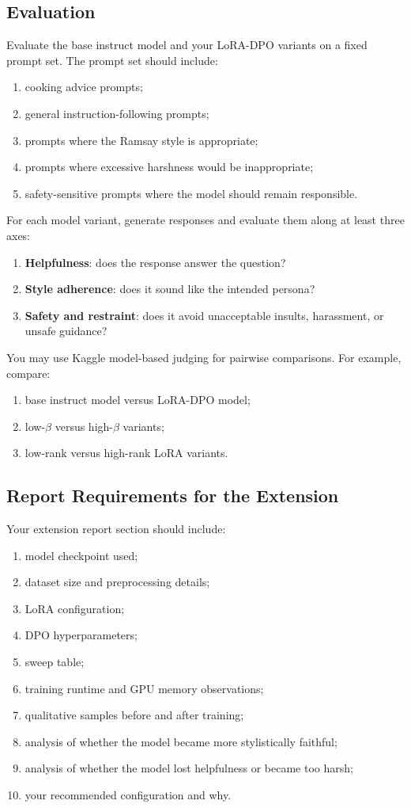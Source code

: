 \documentclass[11pt]{article}
\begin{document}
\subsection{Evaluation}
Evaluate the base instruct model and your LoRA-DPO variants on a fixed prompt set. The prompt set should include:
\begin{enumerate}[leftmargin=*]
  \item cooking advice prompts;
  \item general instruction-following prompts;
  \item prompts where the Ramsay style is appropriate;
  \item prompts where excessive harshness would be inappropriate;
  \item safety-sensitive prompts where the model should remain responsible.
\end{enumerate}

For each model variant, generate responses and evaluate them along at least three axes:
\begin{enumerate}[leftmargin=*]
  \item \textbf{Helpfulness}: does the response answer the question?
  \item \textbf{Style adherence}: does it sound like the intended persona?
  \item \textbf{Safety and restraint}: does it avoid unacceptable insults, harassment, or unsafe guidance?
\end{enumerate}

You may use Kaggle model-based judging for pairwise comparisons. For example, compare:
\begin{enumerate}[leftmargin=*]
  \item base instruct model versus LoRA-DPO model;
  \item low-$\beta$ versus high-$\beta$ variants;
  \item low-rank versus high-rank LoRA variants.
\end{enumerate}

\subsection{Report Requirements for the Extension}
Your extension report section should include:
\begin{enumerate}[leftmargin=*]
  \item model checkpoint used;
  \item dataset size and preprocessing details;
  \item LoRA configuration;
  \item DPO hyperparameters;
  \item sweep table;
  \item training runtime and GPU memory observations;
  \item qualitative samples before and after training;
  \item analysis of whether the model became more stylistically faithful;
  \item analysis of whether the model lost helpfulness or became too harsh;
  \item your recommended configuration and why.
\end{enumerate}
\end{document}
